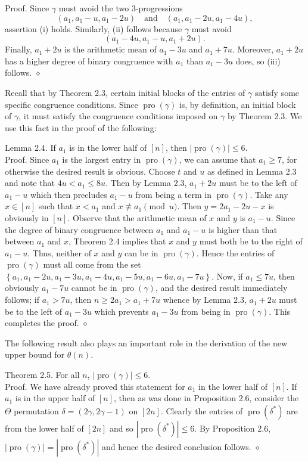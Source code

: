 \documentclass[10pt]{article}
\newcommand{\proofend}{\hfill\(\diamond\)}
\begin{document}
Proof. Since $\gamma$ must avoid the two 3-progressions
\[
\left(a_{1},a_{1}-u,a_{1}-2u\right)
\quad\text{and}\quad
\left(a_{1},a_{1}-2u,a_{1}-4u\right),
\]
assertion (i) holds. Similarly, (ii) follows because $\gamma$ must avoid
\[
\left(a_{1}-4u,a_{1}-u,a_{1}+2u\right).
\]
Finally, $a_{1}+2u$ is the arithmetic mean of $a_{1}-3u$ and $a_{1}+7u$. Moreover, $a_{1}+2u$ has a higher degree of binary congruence with $a_{1}$ than $a_{1}-3u$ does, so (iii) follows. \proofend

Recall that by Theorem 2.3, certain initial blocks of the entries of $\gamma$ satisfy some specific congruence conditions. Since $\operatorname{pro}(\gamma)$ is, by definition, an initial block of $\gamma$, it must satisfy the congruence conditions imposed on $\gamma$ by Theorem 2.3. We use this fact in the proof of the following:

Lemma 2.4. If $a_{1}$ is in the lower half of $[n]$, then $|\operatorname{pro}(\gamma)| \leq 6$.\\
Proof. Since $a_{1}$ is the largest entry in $\operatorname{pro}(\gamma)$, we can assume that $a_{1} \geq 7$, for otherwise the desired result is obvious. Choose $t$ and $u$ as defined in Lemma 2.3 and note that $4 u<a_{1} \leq 8 u$. Then by Lemma 2.3, $a_{1}+2 u$ must be to the left of $a_{1}-u$ which then precludes $a_{1}-u$ from being a term in $\operatorname{pro}(\gamma)$. Take any $x \in[n]$ such that $x<a_{1}$ and $x \not\equiv a_{1} \pmod{u}$. Then $y=2 a_{1}-2 u-x$ is obviously in $[n]$. Observe that the arithmetic mean of $x$ and $y$ is $a_{1}-u$. Since the degree of binary congruence between $a_{1}$ and $a_{1}-u$ is higher than that between $a_{1}$ and $x$, Theorem 2.4 implies that $x$ and $y$ must both be to the right of $a_{1}-u$. Thus, neither of $x$ and $y$ can be in $\operatorname{pro}(\gamma)$. Hence the entries of $\operatorname{pro}(\gamma)$ must all come from the set $\left\{a_{1}, a_{1}-2u, a_{1}-3u, a_{1}-4u, a_{1}-5u, a_{1}-6u, a_{1}-7u\right\}$. Now, if $a_{1} \leq 7 u$, then obviously $a_{1}-7 u$ cannot be in $\operatorname{pro}(\gamma)$, and the desired result immediately follows; if $a_{1}>7 u$, then $n \geq 2 a_{1}>a_{1}+7 u$ whence by Lemma 2.3, $a_{1}+2 u$ must be to the left of $a_{1}-3 u$ which prevents $a_{1}-3 u$ from being in $\operatorname{pro}(\gamma)$. This completes the proof. \proofend

The following result also plays an important role in the derivation of the new upper bound for $\theta(n)$.

Theorem 2.5. For all $n$, $|\operatorname{pro}(\gamma)| \leq 6$.\\
Proof. We have already proved this statement for $a_{1}$ in the lower half of $[n]$. If $a_{1}$ is in the upper half of $[n]$, then as was done in Proposition 2.6, consider the $\Theta$ permutation $\delta=(2 \gamma, 2 \gamma-1)$ on $[2 n]$. Clearly the entries of $\operatorname{pro}\left(\delta^{*}\right)$ are from the lower half of $[2 n]$ and so $\left|\operatorname{pro}\left(\delta^{*}\right)\right| \leq 6$. By Proposition 2.6, $|\operatorname{pro}(\gamma)|=\left|\operatorname{pro}(\delta^{*})\right|$ and hence the desired conclusion follows. \proofend
\end{document}
